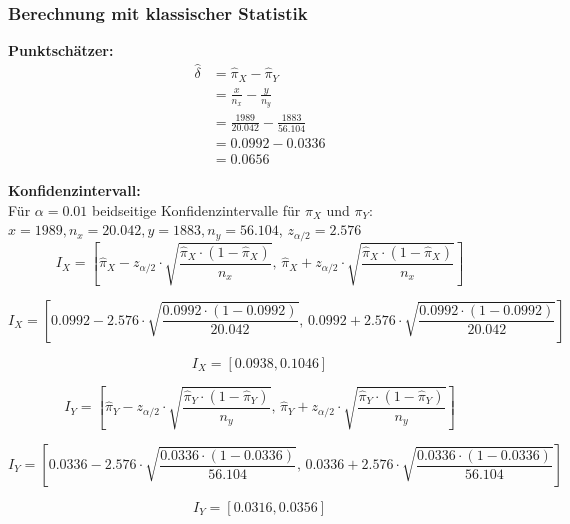 \documentclass[a4paper,12pt]{article}
\begin{document}
\subsubsection{Berechnung mit klassischer Statistik}
\textbf{Punktschätzer:} 
\begin{align}
  \hat{\delta} &= \hat{\pi}_X - \hat{\pi}_Y \\
  &= \frac{x}{n_x} - \frac{y}{n_y} \\
  &= \frac{1989}{20.042} - \frac{1883}{56.104} \\
  &= 0.0992 - 0.0336 \\
  &= 0.0656
\end{align}

\textbf{Konfidenzintervall:} \\
Für $\alpha = 0.01$ beidseitige Konfidenzintervalle für $\pi_X$ und $\pi_Y$: \\
$x = 1989, n_x = 20.042, y = 1883, n_y = 56.104$, $z_{\alpha/2} = 2.576$ \\

\begin{equation}
  I_X = \left[\hat{\pi}_X - z_{\alpha/2} \cdot \sqrt{\frac{\hat{\pi}_X \cdot (1-\hat{\pi}_X)}{n_x}}, \, 
  \hat{\pi}_X + z_{\alpha/2} \cdot \sqrt{\frac{\hat{\pi}_X \cdot (1-\hat{\pi}_X)}{n_x}}\right]
\end{equation}

\begin{equation}
  I_X = \left[0.0992 - 2.576 \cdot \sqrt{\frac{0.0992 \cdot (1-0.0992)}{20.042}}, \, 
  0.0992 + 2.576 \cdot \sqrt{\frac{0.0992 \cdot (1-0.0992)}{20.042}}\right]
\end{equation}

\[
I_X = [0.0938, 0.1046]
\]

\begin{equation}
  I_Y = \left[\hat{\pi}_Y - z_{\alpha/2} \cdot \sqrt{\frac{\hat{\pi}_Y \cdot (1-\hat{\pi}_Y)}{n_y}}, \, 
  \hat{\pi}_Y + z_{\alpha/2} \cdot \sqrt{\frac{\hat{\pi}_Y \cdot (1-\hat{\pi}_Y)}{n_y}}\right]
\end{equation}

\begin{equation}
  I_Y = \left[0.0336 - 2.576 \cdot \sqrt{\frac{0.0336 \cdot (1-0.0336)}{56.104}}, \, 
  0.0336 + 2.576 \cdot \sqrt{\frac{0.0336 \cdot (1-0.0336)}{56.104}}\right]
\end{equation}

\[
I_Y = [0.0316, 0.0356]
\]
\end{document}
